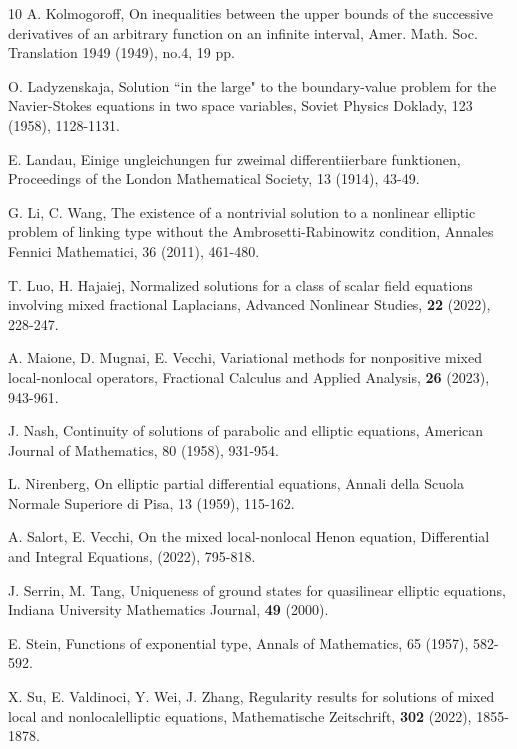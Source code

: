 \documentclass[12pt,a4paper,reqno]{amsart}
\numberwithin{equation}{section}
\begin{document}
\begin{thebibliography}{10}
A. Kolmogoroff,
On inequalities between the upper bounds of the successive derivatives of an arbitrary function on an infinite interval,
Amer. Math. Soc. Translation
1949 (1949), no.4, 19 pp.


O. Ladyzenskaja,
Solution ``in the large" to the boundary-value problem for the Navier-Stokes equations in two space variables,
Soviet Physics Doklady, 123 (1958), 1128-1131.



E. Landau,
Einige ungleichungen fur zweimal differentiierbare funktionen, Proceedings of the London Mathematical Society,
13 (1914), 43-49.


G. Li, C. Wang,
The existence of a nontrivial solution to a nonlinear elliptic problem of linking type without the Ambrosetti-Rabinowitz condition,
Annales Fennici Mathematici,
36 (2011), 461-480.

T. Luo, H. Hajaiej,
Normalized solutions for a class of scalar
field equations involving mixed fractional
Laplacians,
Advanced Nonlinear Studies,
\textbf{22} (2022), 228-247.


A. Maione, D. Mugnai, E. Vecchi, Variational methods for nonpositive mixed local-nonlocal operators, Fractional Calculus and Applied Analysis, \textbf{26} (2023), 943-961.


J. Nash,
Continuity of solutions of parabolic and elliptic equations,
American Journal of Mathematics, 80 (1958), 931-954.


L. Nirenberg,
On elliptic partial differential equations,
Annali della Scuola Normale Superiore di Pisa,
13 (1959), 115-162.






A. Salort, E. Vecchi,
On the mixed local-nonlocal Henon equation, Differential and Integral Equations, (2022), 795-818.

J. Serrin, M. Tang,
Uniqueness of ground states for quasilinear elliptic equations,
Indiana University Mathematics Journal,
\textbf{49} (2000).



E. Stein,
Functions of exponential type, Annals of Mathematics,
65 (1957), 582-592.


X. Su, E. Valdinoci, Y. Wei, J. Zhang,
Regularity results for solutions of mixed local and nonlocalelliptic equations,
Mathematische Zeitschrift, \textbf{302} (2022), 1855-1878.


\end{thebibliography}
\end{document}
